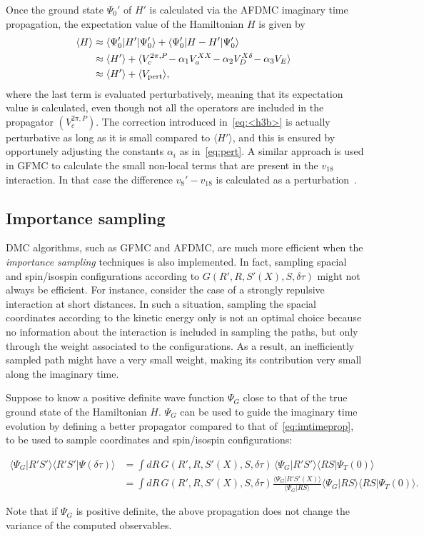 \documentclass[aps,prc,twocolumn,superscriptaddress,floatfix]{revtex4-1}
\begin{document}
Once the ground state $\Psi_0'$ of $H'$ is calculated via the AFDMC imaginary
time propagation, the expectation value of the Hamiltonian $H$ is given by
\begin{align}
\!\!\langle H\rangle &\approx\langle\Psi_0'|H'|\Psi_0'\rangle+\langle\Psi_0'|H-H'|\Psi_0'\rangle \nonumber \\
& \approx\langle H'\rangle+\langle V_c^{2\pi,P}\!-\alpha_1V_a^{XX}\!-\alpha_2V_D^{X\delta}\!-\alpha_3V_E\rangle \nonumber \\
& \approx\langle H'\rangle+\langle V_{\rm pert}\rangle ,
\label{eq:<h3b>}
\end{align}
where the last term is evaluated perturbatively, meaning that its expectation
value is calculated, even though not all the operators are included in the propagator $(V_c^{2\pi,P})$.
The correction introduced in~\cref{eq:<h3b>} is actually perturbative as long as 
it is small compared to $\langle H'\rangle$, and this is ensured by opportunely adjusting 
the constants $\alpha_i$ as in~\cref{eq:pert}.
A similar approach is used in GFMC to calculate the small non-local terms that are 
present in the $v_{18}$ interaction. In that case the difference $v_8'-v_{18}$
is calculated as a perturbation~\cite{Pudliner:1997}.


\subsection{Importance sampling}
\label{sec:is}
DMC algorithms, such as GFMC and AFDMC, are much more efficient when the \emph{importance sampling}
techniques is also implemented.
In fact, sampling spacial and spin/isospin configurations according to $G(R',R,S'(X),S,\delta\tau)$ 
might not always be efficient. For instance, consider the case of a strongly repulsive interaction 
at short distances. In such a situation, sampling the spacial coordinates according to the kinetic 
energy only is not an optimal choice because no information about the interaction is included in 
sampling the paths, but only through the weight associated to the configurations. 
As a result, an inefficiently sampled path might have a very small weight, making its contribution 
very small along the imaginary time.

Suppose to know a positive definite wave function $\Psi_G$ close to that of the true ground state of
the Hamiltonian $H$. $\Psi_G$ can be used to guide the imaginary time evolution by defining a
better propagator compared to that of~\cref{eq:imtimeprop}, to be used to sample coordinates and 
spin/isospin configurations:
\begin{widetext}
\begin{align}
\langle\Psi_G|R'S'\rangle\langle R'S'|\Psi(\delta\tau)\rangle
&=\displaystyle\int dR\,G(R',R,S'(X),S,\delta\tau)\,\langle\Psi_G|R'S'\rangle\langle RS|\Psi_T(0)\rangle
\nonumber \\
&=\displaystyle\int dR\,G(R',R,S'(X),S,\delta\tau)\frac{\langle\Psi_G|R'S'(X)\rangle}{\langle\Psi_G|RS\rangle}
\langle\Psi_G|RS\rangle\langle RS|\Psi_T(0)\rangle .
\end{align}
\end{widetext}
Note that if $\Psi_G$ is positive definite, the above propagation does not change the 
variance of the computed observables.
\end{document}
